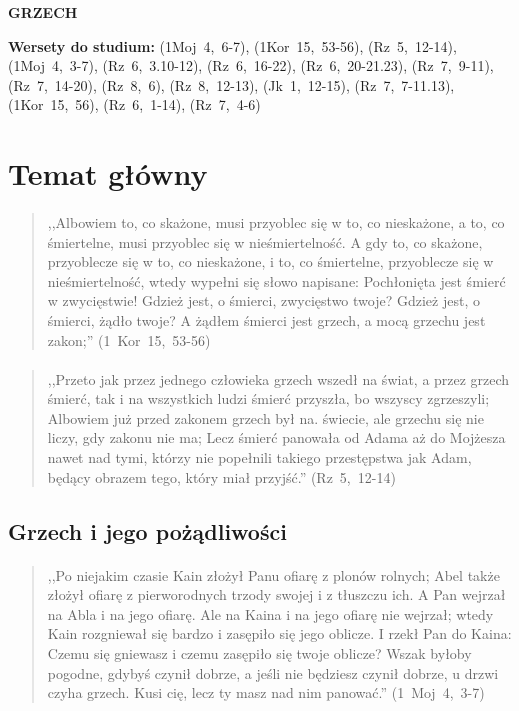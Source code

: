 \documentclass[10pt,a4paper,oneside]{article}
\begin{document}
\centerline{\textbf{\MakeUppercase{Grzech}}}
\begin{center}
\textbf{Wersety do studium:} \mbox{(1Moj 4, 6-7)}, \mbox{(1Kor 15, 53-56)}, \mbox{(Rz 5, 12-14)}, \mbox{(1Moj 4, 3-7)}, \mbox{(Rz 6, 3.10-12)}, \mbox{(Rz 6, 16-22)}, \mbox{(Rz 6, 20-21.23)}, \mbox{(Rz 7, 9-11)}, \mbox{(Rz 7, 14-20)}, \mbox{(Rz 8, 6)}, \mbox{(Rz 8, 12-13)}, \mbox{(Jk 1, 12-15)}, \mbox{(Rz 7, 7-11.13)}, \mbox{(1Kor 15, 56)}, \mbox{(Rz 6, 1-14)}, \mbox{(Rz 7, 4-6)}
\end{center}
\section{Temat główny}
\paragraph{}
\begin{quote}
,,Albowiem to, co skażone, musi przyoblec się w to, co nieskażone, a to, co śmiertelne, musi przyoblec się w nieśmiertelność. A gdy to, co skażone, przyoblecze się w to, co nieskażone, i to, co śmiertelne, przyoblecze się w nieśmiertelność, wtedy wypełni się słowo napisane: Pochłonięta jest śmierć w zwycięstwie! Gdzież jest, o śmierci, zwycięstwo twoje? Gdzież jest, o śmierci, żądło twoje? A żądłem śmierci jest grzech, a mocą grzechu jest zakon;'' \mbox{(1 Kor 15, 53-56)}
\end{quote}
\paragraph{}
\begin{quote}
,,Przeto jak przez jednego człowieka grzech wszedł na świat, a przez grzech śmierć, tak i na wszystkich ludzi śmierć przyszła, bo wszyscy zgrzeszyli; Albowiem już przed zakonem grzech był na. świecie, ale grzechu się nie liczy, gdy zakonu nie ma; Lecz śmierć panowała od Adama aż do Mojżesza nawet nad tymi, którzy nie popełnili takiego przestępstwa jak Adam, będący obrazem tego, który miał przyjść.'' \mbox{(Rz 5, 12-14)}
\end{quote}
\subsection{Grzech i jego pożądliwości}
\paragraph{}
\begin{quote}
,,Po niejakim czasie Kain złożył Panu ofiarę z plonów rolnych; Abel także złożył ofiarę z pierworodnych trzody swojej i z tłuszczu ich. A Pan wejrzał na Abla i na jego ofiarę. Ale na Kaina i na jego ofiarę nie wejrzał; wtedy Kain rozgniewał się bardzo i zasępiło się jego oblicze. I rzekł Pan do Kaina: Czemu się gniewasz i czemu zasępiło się twoje oblicze? Wszak byłoby pogodne, gdybyś czynił dobrze, a jeśli nie będziesz czynił dobrze, u drzwi czyha grzech. Kusi cię, lecz ty masz nad nim panować.'' \mbox{(1 Moj 4, 3-7)}
\end{quote}
\end{document}
